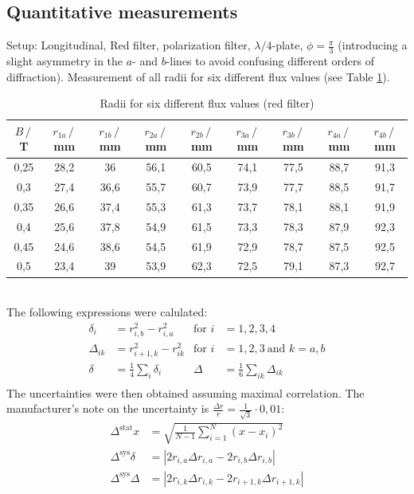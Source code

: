 \documentclass[a4paper,12pt]{article}
\newcommand{\kla}{}
\newcommand{\tecxt}{}
\begin{document}
\subsection{Quantitative measurements}
Setup: Longitudinal, Red filter, polarization filter, $\lambda/4$-plate, $\phi=\frac{\pi}{3}$ (introducing a slight asymmetry in the $a$- and $b$-lines to avoid confusing different orders of diffraction).
Measurement of all radii for six different flux values (see Table \ref{Radii for six different flux values red filter}).
\begin{table}[h!]
\centering
\begin{tabular}{c||c|c|c|c|c|c|c|c}
$B\,/\,$T&$r_{1a}\,/\,$mm&$r_{1b}\,/\,$mm&$r_{2a}\,/\,$mm&$r_{2b}\,/\,$mm&$r_{3a}\,/\,$mm&$r_{3b}\,/\,$mm&$r_{4a}\,/\,$mm&$r_{4b}\,/\,$mm \\ \hline
0,25&	28,2&	36	  &  56,1	&60,5	&74,1	&77,5	&88,7	&91,3\\ \hline
0,3	 &   27,4&	36,6	&55,7	&60,7	&73,9	&77,7	&88,5	&91,7\\ \hline
0,35&	26,6&	37,4	&55,3	&61,3	&73,7	&78,1	&88,1	&91,9\\ \hline
0,4	 &   25,6&	37,8	&54,9	&61,5	&73,3	&78,3	&87,9	&92,3\\ \hline
0,45&	24,6	&38,6	&54,5	&61,9	&72,9	&78,7	&87,5	&92,5\\ \hline
0,5	&    23,4&	39	    &53,9	&62,3	&72,5	&79,1	&87,3	&92,7
\end{tabular}
\caption{Radii for six different flux values (red filter)}
\label{Radii for six different flux values red filter}
\end{table}\\
The following expressions were calulated: 
\begin{align*}
\delta_i&=r_{i,b}^2-r_{i,a}^2&\tecxt\text{for }i&=1,2,3,4\\
\Delta_{ik}&=r_{i+1,k}^2-r_{ik}^2&\tecxt\text{for }i&=1,2,3\ \tecxt\text{and }k=a,b\\
\delta &= \frac{1}{4}\sum_i\delta_i &\Delta &=\frac{1}{6}\sum_{ik}\Delta_{ik}\\
\end{align*}
The uncertainties were then obtained assuming maximal correlation. The manufacturer's note on the uncertainty is $\frac{\Delta r}{r}=\frac{1}{\sqrt{3}}\cdot 0,01$:
\begin{align*}
\Delta^\tecxt\text{stat}x&=\sqrt{\frac{1}{N-1}\sum_{i=1}^N\kla\left( {x-x_i} \right)^2}\\
\Delta^\tecxt\text{sys}\delta&=\left\vert 2r_{i,a}\Delta r_{i,a} -2r_{i,b}\Delta r_{i,b}\right\vert\\
\Delta^\tecxt\text{sys}\Delta&=\left\vert 2r_{i,k}\Delta r_{i,k}-2r_{i+1,k}\Delta r_{i+1,k}\right\vert
\end{align*} 
\end{document}
